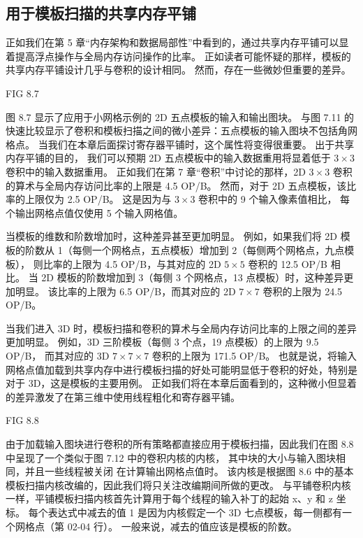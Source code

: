 \subsection{用于模板扫描的共享内存平铺}
正如我们在第 5 章“内存架构和数据局部性”中看到的，通过共享内存平铺可以显着提高浮点操作与全局内存访问操作的比率。 
正如读者可能怀疑的那样，模板的共享内存平铺设计几乎与卷积的设计相同。 然而，存在一些微妙但重要的差异。

{\color{red} FIG 8.7}

图 8.7 显示了应用于小网格示例的 2D 五点模板的输入和输出图块。 
与图 7.11 的快速比较显示了卷积和模板扫描之间的微小差异：五点模板的输入图块不包括角网格点。 
当我们在本章后面探讨寄存器平铺时，这个属性将变得很重要。 出于共享内存平铺的目的，
我们可以预期 2D 五点模板中的输入数据重用将显着低于 $3 \times 3$ 卷积中的输入数据重用。 
正如我们在第 7 章“卷积”中讨论的那样，2D $3 \times 3$ 卷积的算术与全局内存访问比率的上限是 4.5 OP/B。 
然而，对于 2D 五点模板，该比率的上限仅为 2.5 OP/B。 这是因为与 $3 \times 3$ 卷积中的 9 个输入像素值相比，
每个输出网格点值仅使用 5 个输入网格值。

当模板的维数和阶数增加时，这种差异甚至更加明显。 
例如，如果我们将 2D 模板的阶数从 1（每侧一个网格点，五点模板）增加到 2（每侧两个网格点，九点模板），
则比率的上限为 4.5 OP/B，与其对应的 2D $5 \times 5$ 卷积的 12.5 OP/B 相比。 
当 2D 模板的阶数增加到 3（每侧 3 个网格点，13 点模板）时，这种差异更加明显。 
该比率的上限为 6.5 OP/B，而其对应的 2D $7 \times 7$ 卷积的上限为 24.5 OP/B。

当我们进入 3D 时，模板扫描和卷积的算术与全局内存访问比率的上限之间的差异更加明显。 
例如，3D 三阶模板（每侧 3 个点，19 点模板）的上限为 9.5 OP/B，
而其对应的 3D $7 \times 7 \times 7$ 卷积的上限为 171.5 OP/B。 
也就是说，将输入网格点值加载到共享内存中进行模板扫描的好处可能明显低于卷积的好处，特别是对于 3D，这是模板的主要用例。 
正如我们将在本章后面看到的，这种微小但显着的差异激发了在第三维中使用线程粗化和寄存器平铺。

{\color{red} FIG 8.8}

由于加载输入图块进行卷积的所有策略都直接应用于模板扫描，因此我们在图 8.8 中呈现了一个类似于图 7.12 中的卷积内核的内核，
其中块的大小与输入图块相同，并且一些线程被关闭 在计算输出网格点值时。 
该内核是根据图 8.6 中的基本模板扫描内核改编的，因此我们将只关注改编期间所做的更改。 
与平铺卷积内核一样，平铺模板扫描内核首先计算用于每个线程的输入补丁的起始 x、y 和 z 坐标。 
每个表达式中减去的值 1 是因为内核假定一个 3D 七点模板，每一侧都有一个网格点（第 02-04 行）。 
一般来说，减去的值应该是模板的阶数。

